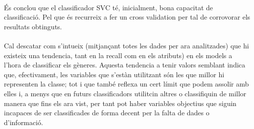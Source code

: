 \documentclass[a4paper, 11pt]{article}
\begin{document}
\\
És conclou que el classificador SVC té, inicialment, bona capacitat de classificació. Pel que és recurreix a fer un cross validation per tal de corrovorar els resultats obtinguts.\\\\
Cal descatar com s'intueix (mitjançant totes les dades per ara analitzades) que hi existeix una tendencia, tant en la recall com en els atributs) en els models a l'hora de classificar els gèneres. Aquesta tendencia a tenir valors semblant indica que, efectivament, les variables que s'estàn utilitzant són les que millor hi representen la classe; tot i que també reflexa un cert límit que podem assolïr amb elles i, a menys que en futurs classificadors utilitcin altres o classifiquin de millor manera que fins els ara vist, per tant pot haber variables objectius que siguin incapaces de ser classificades de forma decent per la  falta de dades o d'informació.
\newpage 
\end{document}
